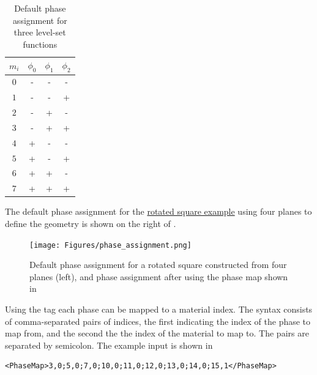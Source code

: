 \begin{table}[H]
\begin{center}
\begin{tabular}{ c|c c c } 
    $m_i$ & $\phi_0$ & $\phi_1$ & $\phi_2$ \\
    \hline
    $0$ & - & - & - \\ 
    $1$ & - & - & + \\ 
    $2$ & - & + & - \\ 
    $3$ & - & + & + \\ 
    $4$ & + & - & - \\ 
    $5$ & + & - & + \\ 
    $6$ & + & + & - \\ 
    $7$ & + & + & + \\ 
\end{tabular}
\label{tab:default_phase_assignment}
\caption{Default phase assignment for three level-set functions}
\end{center}
\end{table}

The default phase assignment for the \href{https://github.com/kkmaute/moris/blob/main/share/doc/mesh_generation/examples/Rotated_Square_Example.xml}{rotated square example} using four planes to define the geometry is shown on the right of . 

\begin{figure}[t]
    \begin{center}
    \texttt{[image: Figures/phase\_assignment.png]}
    \caption{Default phase assignment for a rotated square constructed from four planes (left), and phase assignment after using the phase map shown in } 
    \label{fig:phase_assignment}
    \end{center}
\end{figure}

Using the tag  each phase can be mapped to a material index. The syntax consists of comma-separated pairs of indices, the first indicating the index of the phase to map from, and the second the the index of the material to map to. The pairs are separated by semicolon. The example input is shown in 

\begin{minipage}{\linewidth}
\vspace{0.5cm}
\begin{lstlisting}[caption={Phase map for the material re-assignment shown in \Cref{fig:phase_assignment}},captionpos=b, label={lst:phase_map}]
<PhaseMap>3,0;5,0;7,0;10,0;11,0;12,0;13,0;14,0;15,1</PhaseMap>
\end{lstlisting}
\end{minipage}
    

